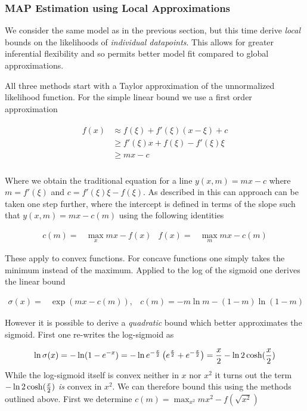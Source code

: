 \subsubsection*{MAP Estimation using Local Approximations}

We consider the same model as in the previous section, but this time derive \emph{local} bounds on the likelihoods of \emph{individual datapoints}. This allows for greater inferential flexibility and so permits better model fit compared to global approximations\cite{Jaakkola1997}.

All three methods start with a Taylor approximation of the unnormalized likelihood function. For the simple linear bound we use a first order approximation

\begin{align}
\begin{split}
f(x) & \approx f(\xi) + f'(\xi) (x - \xi) + c \\
 & \geq f'(\xi) x + f(\xi) - f'(\xi)\xi \\
 & \geq m x - c \\
\end{split}
\end{align}

Where we obtain the traditional equation for a line $y(x, m) = mx - c$ where $m = f'(\xi)$ and $c = f'(\xi)\xi - f(\xi)$. As described in \cite{JordanBook1999} this can approach can be taken one step further, where the intercept is defined in terms of the slope such that $y(x, m) = mx - c(m)$ using the following identities

\begin{align}
c(m) = & \max _x mx - f(x) & f(x) = & \max _m mx - c(m)
\end{align}

These apply to convex functions. For concave functions one simply takes the minimum instead of the maximum. Applied to the log of the sigmoid one derives the linear bound

\begin{align}
\sigma(x) = & \exp(mx - c(m)), & c(m) = -m \ln m - (1-m) \ln (1-m)
\end{align}

However it is possible to derive a \emph{quadratic} bound which better approximates the sigmoid. First one re-writes the log-sigmoid as

\begin{equation}
\ln \sigma(x) = -\ln (1 - e^{-x}) = -\ln e^{-\frac{x}{2}} \left( e^{\frac{x}{2}} + e^{-\frac{x}{2}} \right) = \frac{x}{2} - \ln 2 \cosh (\frac{x}{2}) \label{eqn:jaakkola-start-point}
\end{equation}
 While the log-sigmoid itself is convex neither in $x$ nor $x^2$ it turns out the term $- \ln 2 \cosh (\frac{x}{2})$ \emph{is} convex in $x^2$. We can therefore bound this using the methods outlined above. First we determine $c(m) = \max_{x^2} mx^2 - f(\sqrt{x^2})$ 

